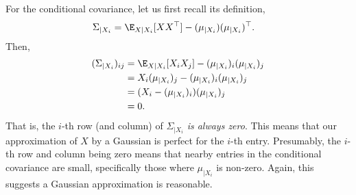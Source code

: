 \documentclass[usletter,twoside,12pt]{book}
\begin{document}
For the conditional covariance, let us first recall its definition,
\begin{align}
   \Sigma_{\mid X_i}
   &= \E_{X \mid X_i}[ X X^\top ] - (\mu_{\mid X_i}) (\mu_{\mid X_i})^\top.
\end{align}
Then,
\begin{align}
   (\Sigma_{\mid X_i})_{ij} &= \E_{X \mid X_i}[ X_i X_j ] - (\mu_{\mid X_i})_i (\mu_{\mid X_i})_j \\
   &= X_i (\mu_{\mid X_i})_j - (\mu_{\mid X_i})_i (\mu_{\mid X_i})_j \\
   &= (X_i - (\mu_{\mid X_i})_i) (\mu_{\mid X_i})_j \\
   &= 0.
\end{align}
That is, the $i$-th row (and column) of $\Sigma_{\mid X_i}$ \emph{is always zero}.
This means that our approximation of $X$ by a Gaussian is perfect for the $i$-th entry.
Presumably, the $i$-th row and column being zero means that nearby entries in the conditional covariance are small, specifically those where $\mu_{\mid X_i}$ is non-zero.
Again, this suggests a Gaussian approximation is reasonable.

\end{document}
